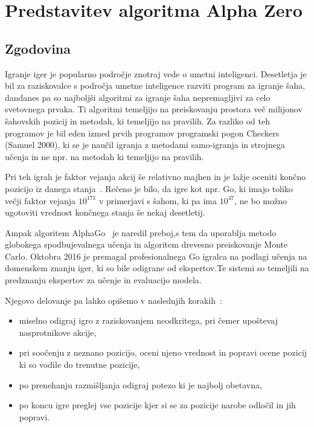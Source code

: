 \documentclass[a4paper, 12pt]{book}
\begin{document}

\chapter{Predstavitev algoritma Alpha Zero}
\label{alphazero}
\section{Zgodovina}

Igranje iger je popularno področje znotraj vede o umetni inteligenci. 
Desetletja je bil za raziskovalce s področja umetne inteligence razviti program za igranje šaha, dandanes pa so najboljši algoritmi za igranje šaha nepremagljivi za celo svetovnega prvaka.
Ti algoritmi temeljijo na preiskovanju prostora več milijonov šahovskih pozicij in metodah, ki temeljijo na pravilih.
Za razliko od teh programov je bil eden izmed prvih programov programski pogon Checkers (Samuel 2000), ki se je naučil igranja z metodami samo-igranja in strojnega učenja in ne npr. na metodah ki temeljijo na pravilih.

 Pri teh igrah je faktor vejanja akcij še relativno majhen in je lažje oceniti končno pozicijo iz danega stanja~\cite{wiki:AlphaGo}.
Rečeno je bilo, da igre kot npr. Go, ki imajo toliko večji faktor vejanja $10^{171}$ v primerjavi s šahom, ki pa ima $10^{47}$, ne bo možno ugotoviti vrednost končnega stanja še nekaj desetletij.

Ampak algoritem AlphaGo~\cite{silver2016mastering} je naredil preboj,s tem da uporablja metodo globokega spodbujevalnega učenja in algoritem drevesno preiskovanje Monte Carlo. Oktobra 2016 je premagal profesionalnega Go igralca na podlagi učenja na domenskem znanju iger, ki so bile odigrane od ekspertov.Te sistemi so temeljili na predznanju ekspertov za učenje in evaluacijo modela.

Njegovo delovanje pa lahko opišemo v naslednjih korakih~\cite{guid}:
\begin{itemize}
	\item miselno odigraj igro z raziskovanjem neodkritega, pri čemer upoštevaj nasprotnikove akcije,
	\item pri soočenju z neznano pozicijo, oceni njeno vrednost in popravi ocene pozicij ki so vodile do trenutne pozicije,
	\item po prenehanju razmišljanja odigraj potezo ki je najbolj obetavna,
	\item po koncu igre preglej vse pozicije kjer si se za pozicije narobe odločil in jih popravi.
\end{itemize}
\end{document}
